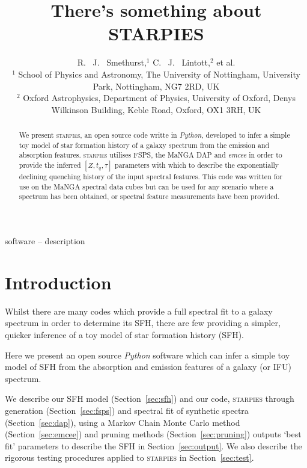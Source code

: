 \documentclass[useAMS,usenatbib]{mn2e}
\begin{document}
\title[There's something about \textsc{starpies}]{There's something about STARPIES}
\author[Smethurst et al. 2018]{R. ~J. ~Smethurst,$^{1}$ C. ~J. ~Lintott,$^{2}$ et al.
\\ $^1$ School of Physics and Astronomy, The University of Nottingham, University Park, Nottingham, NG7 2RD, UK
\\ $^2$ Oxford Astrophysics, Department of Physics, University of Oxford, Denys Wilkinson Building, Keble Road, Oxford, OX1 3RH, UK
}

\maketitle

\begin{abstract}
We present \textsc{starpies}, an open source code writte in \emph{Python}, developed to infer a simple toy model of star formation history of a galaxy spectrum from the emission and absorption  features. \textsc{starpies} utilises FSPS, the MaNGA DAP and \emph{emcee} in order to provide the inferred $[Z, t_q, \tau]$ parameters with which to describe the exponentially declining quenching history of the input spectral features. This code was written for use on the MaNGA spectral data cubes but can be used for any scenario where a spectrum has been obtained, or spectral feature measurements have been provided. 
\end{abstract}

\begin{keywords}
software -- description
\end{keywords}

\section{Introduction}

Whilst there are many codes which provide a full spectral fit to a galaxy spectrum in order to determine its SFH, there are few providing a simpler, quicker inference of a toy model of star formation history (SFH). 

Here we present an open source \emph{Python} software which can infer a simple toy model of SFH from the absorption and emission features of a galaxy (or IFU) spectrum. 

We describe our SFH model (Section~\ref{sec:sfh}) and our code, \textsc{starpies} through generation (Section~\ref{sec:fsps}) and spectral fit of synthetic spectra (Section~\ref{sec:dap}), using a Markov Chain Monte Carlo method (Section~\ref{sec:emcee}) and pruning methods (Section~\ref{sec:pruning}) outputs `best fit' parameters to describe the SFH in Section~\ref{sec:output}. We also describe the rigorous testing procedures applied to \textsc{starpies} in Section~\ref{sec:test}.   
\end{document}
